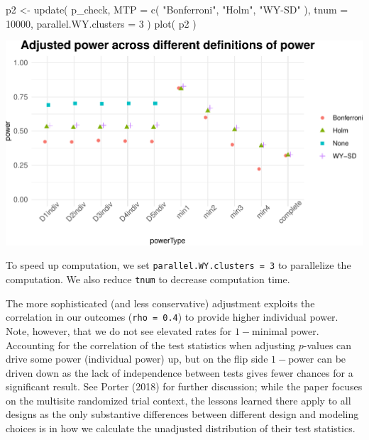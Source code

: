 \documentclass{article}
\newenvironment{Shaded}{\begin{snugshade}}{\end{snugshade}}
\newcommand{\AttributeTok}[1]{\textcolor[rgb]{0.77,0.63,0.00}{#1}}
\newcommand{\DecValTok}[1]{\textcolor[rgb]{0.00,0.00,0.81}{#1}}
\newcommand{\FunctionTok}[1]{\textcolor[rgb]{0.00,0.00,0.00}{#1}}
\newcommand{\NormalTok}[1]{#1}
\newcommand{\OtherTok}[1]{\textcolor[rgb]{0.56,0.35,0.01}{#1}}
\newcommand{\StringTok}[1]{\textcolor[rgb]{0.31,0.60,0.02}{#1}}
\begin{document}
\begin{Shaded}
\begin{Highlighting}[]
\NormalTok{p2 }\OtherTok{\textless{}{-}} \FunctionTok{update}\NormalTok{( p\_check,}
              \AttributeTok{MTP =} \FunctionTok{c}\NormalTok{( }\StringTok{"Bonferroni"}\NormalTok{, }\StringTok{"Holm"}\NormalTok{, }\StringTok{"WY{-}SD"}\NormalTok{ ),}
              \AttributeTok{tnum =} \DecValTok{10000}\NormalTok{,}
              \AttributeTok{parallel.WY.clusters =} \DecValTok{3}\NormalTok{ )}
\FunctionTok{plot}\NormalTok{( p2 )}
\end{Highlighting}
\end{Shaded}

\begin{center}\includegraphics{othercorrections-1} \end{center}

To speed up computation, we set \texttt{parallel.WY.clusters\ =\ 3} to
parallelize the computation. We also reduce \texttt{tnum} to decrease
computation time.

The more sophisticated (and less conservative) adjustment exploits the
correlation in our outcomes (\texttt{rho\ =\ 0.4}) to provide higher
individual power. Note, however, that we do not see elevated rates for
\(1-\)minimal power. Accounting for the correlation of the test
statistics when adjusting \(p\)-values can drive some power (individual
power) up, but on the flip side \(1-\)power can be driven down as the
lack of independence between tests gives fewer chances for a significant
result. See Porter (2018) for further discussion; while the paper
focuses on the multisite randomized trial context, the lessons learned
there apply to all designs as the only substantive differences between
different design and modeling choices is in how we calculate the
unadjusted distribution of their test statistics.
\end{document}

